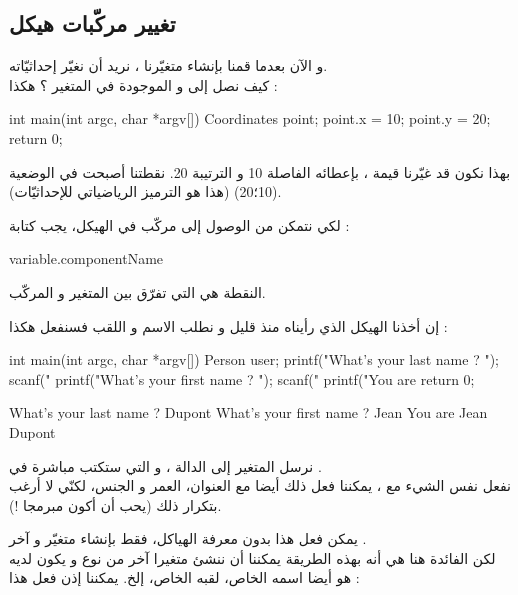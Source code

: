\subsection{تغيير مركّبات هيكل}

و الآن بعدما قمنا بإنشاء متغيّرنا
،
نريد أن نغيّر إحداثيّاته.\\
كيف نصل إلى
و
الموجودة في المتغير
؟ هكذا :

\begin{Csource}
int main(int argc, char *argv[])
{
	Coordinates point;
	point.x = 10;
	point.y = 20;
	return 0;
}
\end{Csource}

بهذا نكون قد غيّرنا قيمة
،
بإعطائه الفاصلة 10 و الترتيبة 20. نقطتنا أصبحت في الوضعية (10؛20) (هذا هو الترميز الرياضياتي للإحداثيّات).

لكي نتمكن من الوصول إلى مركّب في الهيكل، يجب كتابة :

\begin{Csource}
  variable.componentName
\end{Csource}

النقطة هي التي تفرّق بين المتغير و المركّب.

إن أخذنا الهيكل
الذي رأيناه منذ قليل و نطلب الاسم و اللقب فسنفعل هكذا :

\begin{Csource}
int main(int argc, char *argv[])
{
	Person user;
	printf("What's your last name ? ");
	scanf("%
	printf("What's your first name ? ");
	scanf("%
	printf("You are %
	return 0;
}
\end{Csource}

\begin{Console}
What's your last name ? Dupont
What's your first name ? Jean
You are Jean Dupont
\end{Console}

نرسل المتغير
إلى الدالة
،
و التي ستكتب مباشرة في
.\\
نفعل نفس الشيء مع
،
يمكننا فعل ذلك أيضا مع العنوان، العمر و الجنس، لكنّي لا أرغب بتكرار ذلك (يحب أن أكون مبرمجا !).

يمكن فعل هذا بدون معرفة الهياكل، فقط بإنشاء متغيّر
و آخر
.\\
لكن الفائدة هنا هي أنه بهذه الطريقة يمكننا أن ننشئ متغيرا آخر من نوع
و يكون لديه هو أيضا اسمه الخاص، لقبه الخاص، إلخ. يمكننا إذن فعل هذا :

